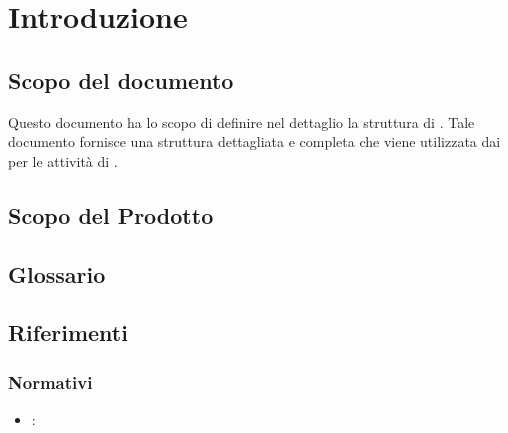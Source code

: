 \section{Introduzione}
\subsection{Scopo del documento}
Questo documento ha lo scopo di definire nel dettaglio la struttura di \capitolato. Tale documento fornisce una struttura dettagliata e completa che viene utilizzata dai \ProgrP per le attività di .
\subsection{Scopo del Prodotto}
\scopoProdotto

\subsection{Glossario}
\descrizioneGlossario

\subsection{Riferimenti}
\subsubsection{Normativi}
\riferimentiNormativi
\begin{itemize}
\item \textbf{\AdR}: \analisiDeiRequisiti
\end{itemize}

